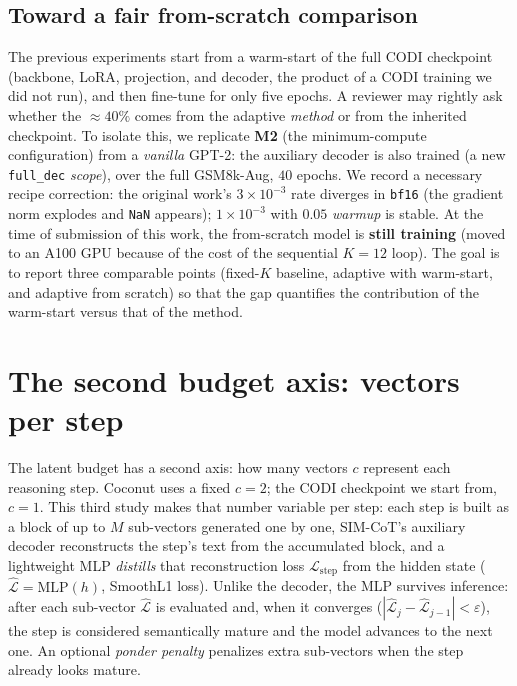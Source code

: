 \documentclass[11pt]{article}
\begin{document}
\subsection{Toward a fair from-scratch comparison}
\label{sec:fromscratch}

The previous experiments start from a warm-start of the full CODI checkpoint (backbone, LoRA, projection, and decoder, the product of a CODI training we did not run), and then fine-tune for only five epochs. A reviewer may rightly ask whether the $\approx 40\%$ comes from the adaptive \emph{method} or from the inherited checkpoint. To isolate this, we replicate \textbf{M2} (the minimum-compute configuration) from a \emph{vanilla} GPT-2: the auxiliary decoder is also trained (a new \texttt{full\_dec} \textit{scope}), over the full GSM8k-Aug, $40$ epochs. We record a necessary recipe correction: the original work's $3\times10^{-3}$ rate diverges in \texttt{bf16} (the gradient norm explodes and \texttt{NaN} appears); $1\times10^{-3}$ with $0.05$ \textit{warmup} is stable. At the time of submission of this work, the from-scratch model is \textbf{still training} (moved to an A100 GPU because of the cost of the sequential $K=12$ loop). The goal is to report three comparable points (fixed-$K$ baseline, adaptive with warm-start, and adaptive from scratch) so that the gap quantifies the contribution of the warm-start versus that of the method.

\section{The second budget axis: vectors per step}
\label{sec:modC}

The latent budget has a second axis: how many vectors $c$ represent each reasoning step. Coconut uses a fixed $c{=}2$; the CODI checkpoint we start from, $c{=}1$. This third study makes that number variable per step: each step is built as a block of up to $M$ sub-vectors generated one by one, SIM-CoT's auxiliary decoder reconstructs the step's text from the accumulated block, and a lightweight MLP \emph{distills} that reconstruction loss $\mathcal{L}_{\text{step}}$ from the hidden state ($\hat{\mathcal{L}} = \mathrm{MLP}(h)$, SmoothL1 loss). Unlike the decoder, the MLP survives inference: after each sub-vector $\hat{\mathcal{L}}$ is evaluated and, when it converges ($|\hat{\mathcal{L}}_j - \hat{\mathcal{L}}_{j-1}| < \varepsilon$), the step is considered semantically mature and the model advances to the next one. An optional \textit{ponder penalty} penalizes extra sub-vectors when the step already looks mature.
\end{document}
